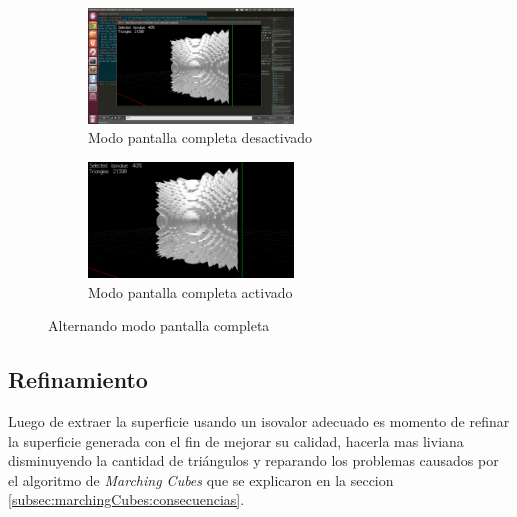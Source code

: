 \begin{figure}[htbp]

	\begin{subfigure}[b]{\textwidth}
		\centering
		\includegraphics[width=0.6\textwidth]{images/visualizer/visualizer_fullscreen_0.png}
		\caption{Modo pantalla completa desactivado}
		\label{c:flujo:visualizer_fullscreen_0}
	\end{subfigure}

	\begin{subfigure}[b]{\textwidth}
		\centering
		\includegraphics[width=0.6\textwidth]{images/visualizer/visualizer_fullscreen_1.png}
		\caption{Modo pantalla completa activado}
		\label{c:flujo:visualizer_fullscreen_1}
	\end{subfigure}

	\caption{Alternando modo pantalla completa}
	\label{c:flujo:alternandoModoPantallaCompleta}

\end{figure}

\subsection{Refinamiento}
\label{ch:propuesta:sec:refinamiento}

Luego de extraer la superficie usando un isovalor adecuado es momento de refinar la superficie generada con el fin de mejorar su calidad, hacerla mas liviana disminuyendo la cantidad de triángulos y reparando los problemas causados por el algoritmo de \emph{Marching Cubes} que se explicaron en la seccion \ref{subsec:marchingCubes:consecuencias}.

